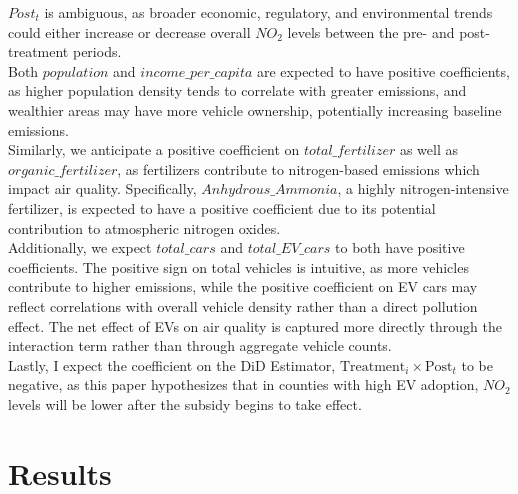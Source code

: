 \documentclass[12pt]{article}
\newcommand\tab[1][.50cm]{\hspace*{#1}}
\begin{document}
\begin{multicols}{2}
		$Post_t$ is ambiguous, as broader economic, regulatory, and environmental trends could either increase or decrease overall $NO_2$ levels between the pre- and post-treatment periods.\\
		\tab Both $population$ and $income\_per\_capita$ are expected to have positive coefficients, as higher population density tends to correlate with greater emissions, and wealthier areas may have more vehicle ownership, potentially increasing baseline emissions.\\
		\tab Similarly, we anticipate a positive coefficient on $total\_fertilizer$ as well as $organic\_fertilizer$, as fertilizers contribute to nitrogen-based emissions which impact air quality. Specifically, $Anhydrous\_Ammonia$, a highly nitrogen-intensive fertilizer, is expected to have a positive coefficient due to its potential contribution to atmospheric nitrogen oxides.\\
		\tab Additionally, we expect $total\_cars$ and $total\_EV\_cars$ to both have positive coefficients. The positive sign on total vehicles is intuitive, as more vehicles contribute to higher emissions, while the positive coefficient on EV cars may reflect correlations with overall vehicle density rather than a direct pollution effect. The net effect of EVs on air quality is captured more directly through the interaction term rather than through aggregate vehicle counts.\\
		\tab Lastly, I expect the coefficient on the DiD Estimator, $\text{Treatment}_{i} \times \text{Post}_{t}$ to be negative, as this paper hypothesizes that in counties with high EV adoption, $NO_2$ levels will be lower after the subsidy begins to take effect. 
		
		\section*{Results}
		

\end{multicols}
\end{document}
